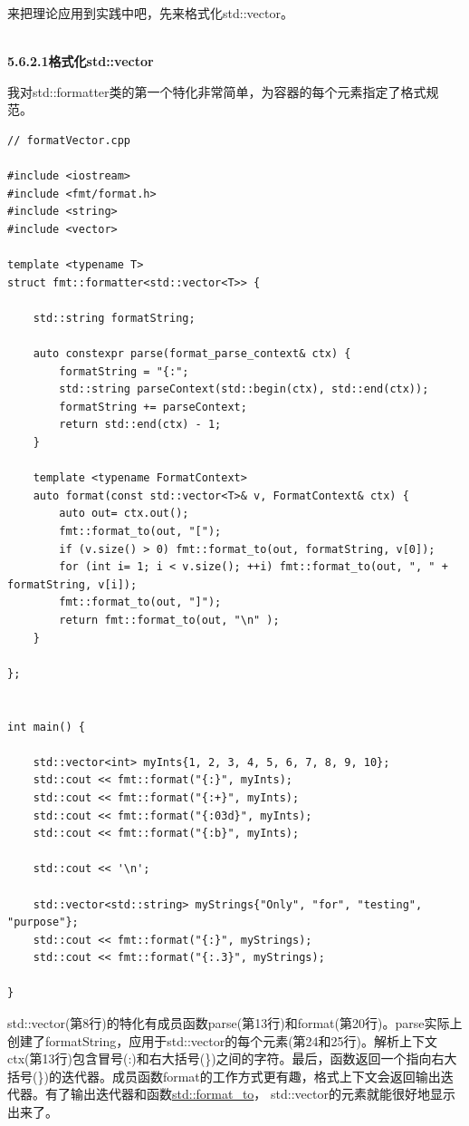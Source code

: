 来把理论应用到实践中吧，先来格式化std::vector。

\hspace*{\fill} \\ %
\noindent
\textbf{5.6.2.1\hspace{0.2cm}格式化std::vector}

我对std::formatter类的第一个特化非常简单，为容器的每个元素指定了格式规范。

\begin{lstlisting}[style=styleCXX]
// formatVector.cpp

#include <iostream>
#include <fmt/format.h>
#include <string>
#include <vector>

template <typename T>
struct fmt::formatter<std::vector<T>> {

	std::string formatString;
	
	auto constexpr parse(format_parse_context& ctx) {
		formatString = "{:";
		std::string parseContext(std::begin(ctx), std::end(ctx));
		formatString += parseContext;
		return std::end(ctx) - 1;
	}
	
	template <typename FormatContext>
	auto format(const std::vector<T>& v, FormatContext& ctx) {
		auto out= ctx.out();
		fmt::format_to(out, "[");
		if (v.size() > 0) fmt::format_to(out, formatString, v[0]);
		for (int i= 1; i < v.size(); ++i) fmt::format_to(out, ", " + formatString, v[i]);
		fmt::format_to(out, "]");
		return fmt::format_to(out, "\n" );
	}

};


int main() {

	std::vector<int> myInts{1, 2, 3, 4, 5, 6, 7, 8, 9, 10};
	std::cout << fmt::format("{:}", myInts);
	std::cout << fmt::format("{:+}", myInts);
	std::cout << fmt::format("{:03d}", myInts);
	std::cout << fmt::format("{:b}", myInts);
	
	std::cout << '\n';
	
	std::vector<std::string> myStrings{"Only", "for", "testing", "purpose"};
	std::cout << fmt::format("{:}", myStrings);
	std::cout << fmt::format("{:.3}", myStrings);

}
\end{lstlisting}

std::vector(第8行)的特化有成员函数parse(第13行)和format(第20行)。parse实际上创建了formatString，应用于std::vector的每个元素(第24和25行)。解析上下文ctx(第13行)包含冒号(:)和右大括号(\})之间的字符。最后，函数返回一个指向右大括号(\})的迭代器。成员函数format的工作方式更有趣，格式上下文会返回输出迭代器。有了输出迭代器和函数\href{https://en.cppreference.com/w/cpp/utility/format/format_to}{std::format\_to}， std::vector的元素就能很好地显示出来了。

